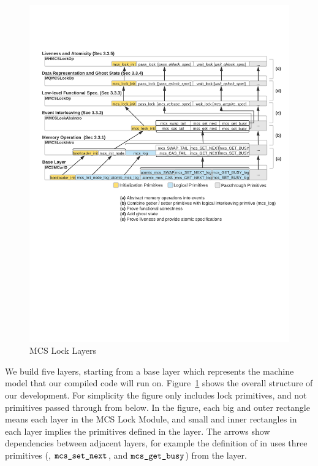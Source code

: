 \begin{figure}
\begin{center}
\includegraphics[width=\textwidth]{figs/mcslock/layer_overview}
\end{center}
\caption{MCS Lock Layers}
\label{fig:chapter:mcslock:layeroverview}
\end{figure}

We build five layers, starting from a base
layer which represents the machine model that our compiled code will
run on.
Figure~\ref{fig:chapter:mcslock:layeroverview} shows the overall structure of our development.
For simplicity the figure only includes lock primitives, and not
primitives passed through from below.
In the figure, each big and outer rectangle means each layer in the MCS Lock Module, 
and small and inner rectangles in each layer implies the primitives defined in the layer.
The arrows show dependencies between adjacent layers,
for example the definition of  in 
uses three primitives (,
${\mathrm{\texttt{mcs$\_$set$\_$next}}}$, and ${\mathrm{\texttt{mcs$\_$get$\_$busy}}}$) from the  layer.


